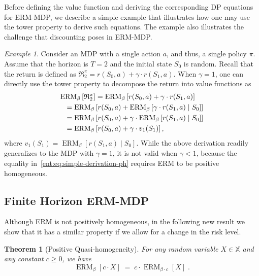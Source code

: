 \documentclass[twoside]{article}
\newcommand{\erm}[2]{\operatorname{ERM}_{#1}\left[#2\right]}
\theoremstyle{plain}
\newtheorem{theorem}{Theorem}[section]
\theoremstyle{definition}
\theoremstyle{remark}
\newtheorem{example}{Example}
\begin{document}
Before defining the value function and deriving the corresponding DP equations for ERM-MDP, we describe a simple example that illustrates how one may use the tower property to derive such equations. The example also illustrates the challenge that discounting poses in ERM-MDP.
\begin{example}\label{ent:ex:singleaction}
Consider an MDP with a single action $a$, and thus, a single policy $\pi$. Assume that the horizon is $T=2$ and the initial state $S_0$ is random. Recall that the return is defined as $\mathfrak{R}_2^{\pi} = r(S_0,a) + \gamma \cdot r(S_1,a)$. When $\gamma = 1$, one can directly use the tower property to decompose the return into value functions as
%
\begin{align}
\erm{\beta}{\mathfrak{R}_2^\pi } &= \erm{\beta}{r(S_0,a) + \gamma \cdot  r(S_1,a)} \nonumber \\
&\hspace{-0.6in}= \erm{\beta}{ r(S_0,a)  + \erm{\beta}{ \gamma\cdot  r(S_1,a) \mid S_0}} \nonumber \\
\label{ent:eq:simple-derivation-ph}
&\hspace{-0.6in}= \erm{\beta}{  r(S_0,a) + \gamma \cdot \erm{\beta}{ r(S_1,a) \mid S_0}} \\
&\hspace{-0.6in}= \erm{\beta}{  r(S_0,a) + \gamma \cdot v_1(S_1)}, \nonumber
\end{align}
%
where $v_1(S_1) = \erm{\beta}{ r(S_1,a) \mid S_0}$. While the above derivation readily generalizes to the MDP with $\gamma=1$, it is not valid when $\gamma < 1$, because the equality in~\eqref{ent:eq:simple-derivation-ph} requires ERM to be positive homogeneous.
\end{example}


\subsection{Finite Horizon ERM-MDP}
\label{ent:subsec:DP-ERM-MDP}

Although ERM is not positively homogeneous, in the following new result we show that it has a similar property if we allow for a change in the risk level.   
%
\begin{theorem}[Positive Quasi-homogeneity] \label{ent:thm:pos-quasi-homogen}
For any random variable $X\in\mathbb X$ and any constant $c \geq 0$, we have 
%
\begin{equation}
\label{ent:eq:PQ-homogeneity}
\erm{\beta}{c\cdot  X} \;=\; c\cdot \erm{\beta \cdot c}{X}\;.
\end{equation}
%
\end{theorem}
\end{document}
